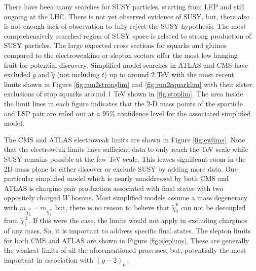 There have been many searches for SUSY particles, starting from  LEP and still ongoing at the LHC. There is not yet observed evidence of SUSY, but, there also is not enough lack of observation to fully reject the SUSY hypothesis. The most comprehensively searched region of SUSY space is related to strong production of SUSY particles. The large expected cross sections for squarks and gluinos compared to the electroweakino or slepton sectors offer the most low hanging fruit for potential discovery.
Simplified model searches in ATLAS and CMS have excluded $\tilde{g}$ and $\tilde{q}$ (not including $\tilde{t}$) up to around 2 TeV with the most recent limits shown in Figure \ref{fig:run2stronglim} and \ref{fig:run2squarklim} with their sister exclusions of stop squarks around 1 TeV shown in \ref{fig:stoplim}. The area inside the limit lines in each figure indicates that the 2-D mass points of the sparticle and LSP pair are ruled out at a 95\% confidence level for the associated simplified model.



The CMS and ATLAS electroweak limits are shown in Figure \ref{fig:ewlims}. Note that the electroweak limits have sufficient data to only reach the TeV scale while SUSY remains possible at the few TeV scale. This leaves significant room in the 2D mass plane to either discover or exclude SUSY by adding more data. One particular simplified model which is nearly unaddressed by both CMS and ATLAS is chargino pair production associated with final states with two oppositely charged $W$ bosons.  Most simplified models assume a mass degeneracy with $m_{\tilde{\chi}^0_2} = m_{\tilde{\chi}^\pm_1}$ but, there is no reason to believe that $\tilde{\chi}^0_2$ can not be decoupled from $\tilde{\chi}^\pm_1$. If this were the case, the limits would not apply in excluding charginos of any mass, So, it is important to address specific final states. The slepton limits  for both CMS and ATLAS are shown in Figure \ref{fig:sleplims}. These are generally the weakest limits of all the aforementioned processes, but, potentially the most important in association with $(g-2)_\mu$.



